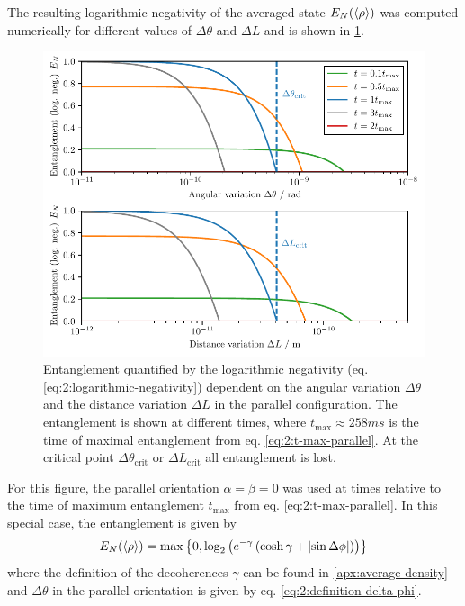 The resulting logarithmic negativity of the averaged state $E_N(\left\langle\rho\right\rangle)$ was computed numerically for different values of $\Delta \theta$ and $\Delta L$ and is shown in \cref{fig:4:EN-delta-theta}.
\begin{figure}[!htb]
  \centering
  \includegraphics[width=\textwidth]{./../figures/theta-variance/EN-deltaTheta-deltaL.pdf}
  \caption{Entanglement quantified by the logarithmic negativity (eq. \eqref{eq:2:logarithmic-negativity}) dependent on the angular variation $\Delta\theta$ and the distance variation $\Delta L$ in the parallel configuration. The entanglement is shown at different times, where $t_\mathrm{max} \approx 258\si{ms}$ is the time of maximal entanglement from eq. \eqref{eq:2:t-max-parallel}. At the critical point $\Delta \theta_\mathrm{crit}$ or $\Delta L_\mathrm{crit}$ all entanglement is lost.}
  \label{fig:4:EN-delta-theta}
\end{figure}
For this figure, the parallel orientation $\alpha = \beta = 0$ was used at times relative to the time of maximum entanglement $t_\mathrm{max}$ from eq. \eqref{eq:2:t-max-parallel}.
In this special case, the entanglement is given by
\begin{equation}\label{eq:4:log-neg-analytical}
  E_N(\left\langle\rho\right\rangle) = \max\left\{ 0, \log_2\left(e^{-\gamma}\left(\cosh\gamma + \left\lvert\sin \Delta \phi\right\rvert\right)\right) \right\}
\end{equation}
where the definition of the decoherences $\gamma$ can be found in \cref{apx:average-density} and $\Delta \theta$ in the parallel orientation is given by eq. \eqref{eq:2:definition-delta-phi}.
